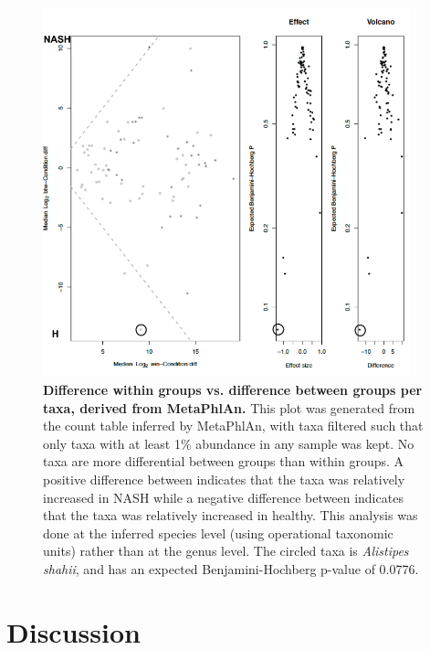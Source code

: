 \begin{figure}[h]
\begin{center}
\includegraphics[width=0.95\textwidth]{metaphlan_aldex.png}
\caption[Difference within groups vs. difference between groups per taxa, derived from MetaPhlAn.]{\textbf{Difference within groups vs. difference between groups per taxa, derived from MetaPhlAn.} This plot was generated from the count table inferred by MetaPhlAn, with taxa filtered such that only taxa with at least 1\% abundance in any sample was kept. No taxa are more differential between groups than within groups. A positive difference between indicates that the taxa was relatively increased in NASH while a negative difference between indicates that the taxa was relatively increased in healthy. This analysis was done at the inferred species level (using operational taxonomic units) rather than at the genus level. The circled taxa is \textit{Alistipes shahii}, and has an expected Benjamini-Hochberg p-value of 0.0776.}
\label{nafld_metaphlan_aldex}
\end{center}
\end{figure}

\FloatBarrier

\section{Discussion}

